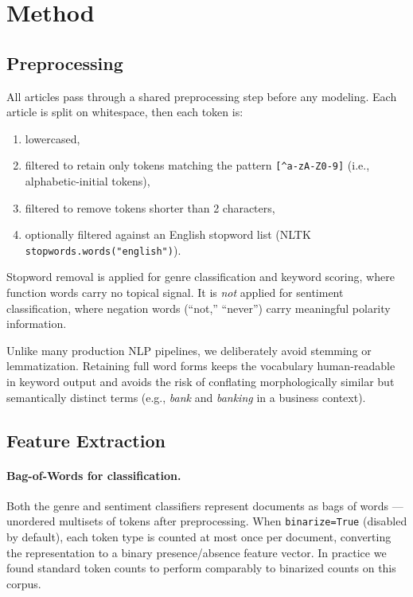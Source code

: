 \section{Method}
\label{sec:method}

\subsection{Preprocessing}

All articles pass through a shared preprocessing step before any modeling. Each article is split on whitespace, then each token is:

\begin{enumerate}
    \item lowercased,
    \item filtered to retain only tokens matching the pattern \texttt{[\^{}a-zA-Z0-9]} (i.e., alphabetic-initial tokens),
    \item filtered to remove tokens shorter than 2 characters,
    \item optionally filtered against an English stopword list (NLTK \texttt{stopwords.words("english")}).
\end{enumerate}

Stopword removal is applied for genre classification and keyword scoring, where function words carry no topical signal. It is \emph{not} applied for sentiment classification, where negation words (``not,'' ``never'') carry meaningful polarity information.

Unlike many production NLP pipelines, we deliberately avoid stemming or lemmatization. Retaining full word forms keeps the vocabulary human-readable in keyword output and avoids the risk of conflating morphologically similar but semantically distinct terms (e.g., \textit{bank} and \textit{banking} in a business context).

\subsection{Feature Extraction}

\paragraph{Bag-of-Words for classification.}
Both the genre and sentiment classifiers represent documents as bags of words — unordered multisets of tokens after preprocessing. When \texttt{binarize=True} (disabled by default), each token type is counted at most once per document, converting the representation to a binary presence/absence feature vector. In practice we found standard token counts to perform comparably to binarized counts on this corpus.

